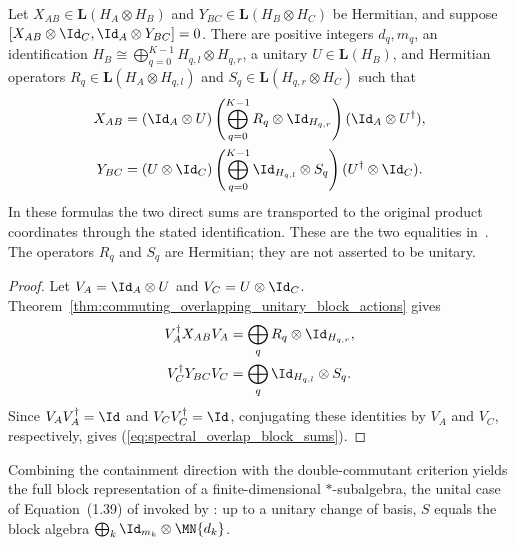 \begin{theorem}%
    \label{thm:commuting_overlapping_block_sum_equalities}
    \leanok
    Let $X_{AB}\in\mathbf L(H_A\otimes H_B)$ and
    $Y_{BC}\in\mathbf L(H_B\otimes H_C)$ be Hermitian, and suppose
    $[X_{AB}\otimes\Id_C,\Id_A\otimes Y_{BC}]=0$. There are positive
    integers $d_q,m_q$, an identification
    $H_B\cong\bigoplus_{q=0}^{K-1}H_{q,l}\otimes H_{q,r}$, a unitary
    $U\in\mathbf L(H_B)$, and Hermitian operators
    $R_q\in\mathbf L(H_A\otimes H_{q,l})$ and
    $S_q\in\mathbf L(H_{q,r}\otimes H_C)$ such that
    \begin{align}
        X_{AB}
        &=(\Id_A\otimes U)
          \left(\bigoplus_{q=0}^{K-1}
          R_q\otimes\Id_{H_{q,r}}\right)
          (\Id_A\otimes U^\dagger), \notag\\
        Y_{BC}
        &=(U\otimes\Id_C)
          \left(\bigoplus_{q=0}^{K-1}
          \Id_{H_{q,l}}\otimes S_q\right)
          (U^\dagger\otimes\Id_C).
        \label{eq:spectral_overlap_block_sums}
    \end{align}
    In these formulas the two direct sums are transported to the original
    product coordinates through the stated identification. These are the
    two equalities in~\cite[Lemma~2.1]{Beigi2012Classification}. The
    operators $R_q$ and $S_q$ are Hermitian; they are not asserted to be
    unitary.
\end{theorem}

\begin{proof}
    \leanok
    Let $V_A=\Id_A\otimes U$ and $V_C=U\otimes\Id_C$.
    Theorem~\ref{thm:commuting_overlapping_unitary_block_actions} gives
    \begin{align}
        V_A^\dagger X_{AB}V_A
        &=\bigoplus_qR_q\otimes\Id_{H_{q,r}}, \notag\\
        V_C^\dagger Y_{BC}V_C
        &=\bigoplus_q\Id_{H_{q,l}}\otimes S_q.
        \notag
    \end{align}
    Since $V_AV_A^\dagger=\Id$ and $V_CV_C^\dagger=\Id$, conjugating these
    identities by $V_A$ and $V_C$, respectively, gives
    (\ref{eq:spectral_overlap_block_sums}).
\end{proof}

Combining the containment direction with the double-commutant criterion
yields the full block representation of a finite-dimensional
$*$-subalgebra, the unital case of Equation~(1.39) of
\cite{Wolf2012Quantum} invoked by
\cite[Theorem~6.14]{Wolf2012Quantum}: up to a unitary change of basis, $S$
equals the block algebra $\bigoplus_k\Id_{m_k}\otimes\MN{d_k}$.

